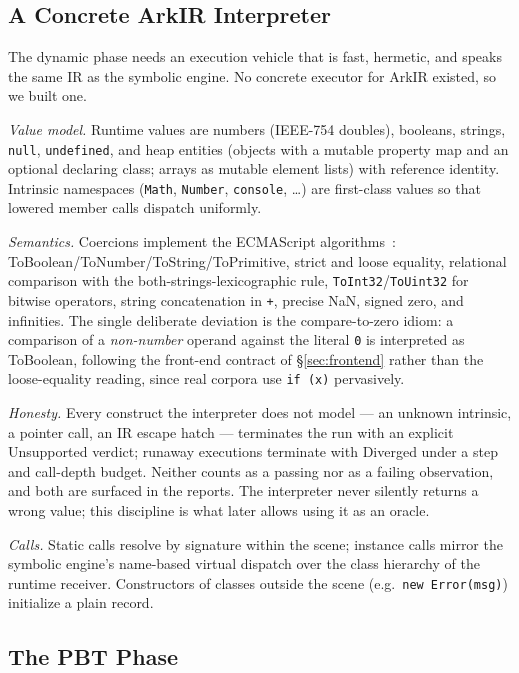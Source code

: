 \documentclass[sigconf,nonacm,screen]{acmart}
\begin{document}
\subsection{A Concrete ArkIR Interpreter}
\label{sec:interp}

The dynamic phase needs an execution vehicle that is fast, hermetic, and
speaks the same IR as the symbolic engine. No concrete executor for ArkIR
existed, so we built one.

\emph{Value model.} Runtime values are numbers (IEEE-754 doubles), booleans,
strings, \lstinline|null|, \lstinline|undefined|, and heap entities (objects
with a mutable property map and an optional declaring class; arrays as
mutable element lists) with reference identity. Intrinsic namespaces
(\lstinline|Math|, \lstinline|Number|, \lstinline|console|, \ldots) are
first-class values so that lowered member calls dispatch uniformly.

\emph{Semantics.} Coercions implement the ECMAScript
algorithms~\cite{ecma262}: ToBoolean/ToNumber/ToString/ToPrimitive,
strict and loose equality, relational comparison with the
both-strings-lexicographic rule, \lstinline|ToInt32|/\lstinline|ToUint32|
for bitwise operators, string concatenation in \lstinline|+|, precise
NaN, signed zero, and infinities. The single deliberate deviation is the
compare-to-zero idiom: a comparison of a \emph{non-number} operand against
the literal \lstinline|0| is interpreted as ToBoolean, following the
front-end contract of \S\ref{sec:frontend} rather than the loose-equality
reading, since real corpora use \lstinline|if (x)| pervasively.

\emph{Honesty.} Every construct the interpreter does not model --- an
unknown intrinsic, a pointer call, an IR escape hatch --- terminates the run
with an explicit \textsf{Unsupported} verdict; runaway executions terminate
with \textsf{Diverged} under a step and call-depth budget. Neither counts as
a passing nor as a failing observation, and both are surfaced in the
reports. The interpreter never silently returns a wrong value; this
discipline is what later allows using it as an oracle.

\emph{Calls.} Static calls resolve by signature within the scene; instance
calls mirror the symbolic engine's name-based virtual dispatch over the
class hierarchy of the runtime receiver. Constructors of classes outside
the scene (e.g.\ \lstinline|new Error(msg)|) initialize a plain record.

\subsection{The PBT Phase}
\label{sec:pbt}
\end{document}
